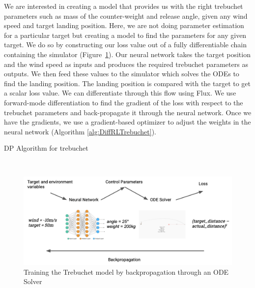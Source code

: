 \documentclass{juliacon}
\begin{document}
We are interested in creating a model that provides us with the right trebuchet parameters such as mass of the counter-weight and release angle, given any wind speed and target landing position. Here, we are not doing parameter estimation for a particular target but creating a model to find the parameters for any given target. We do so by constructing our loss value out of a fully differentiable chain containing the simulator (Figure~\ref{fig:trebuchet}). Our neural network takes the target position and the wind speed as inputs and produces the required trebuchet parameters as outputs. We then feed these values to the simulator which solves the ODEs to find the landing position. The landing position is compared with the target to get a scalar loss value. We can differentiate through this flow using Flux. We use forward-mode differentiation to find the gradient of the loss with respect to the trebuchet parameters and back-propagate it through the neural network. Once we have the gradients, we use a gradient-based optimizer to adjust the weights in the neural network (Algorithm \ref{alg:DiffRLTrebuchet}).

\begin{algorithm}[!htb]
    \caption{DP Algorithm for trebuchet}
    \label{alg:DiffRLTrebuchet}
    \SetAlgoLined
    \
\end{algorithm}

\begin{figure}[!htbp]
    \centering
    \includegraphics[width=\linewidth]{images/trebuchet-flow.png}
    \caption{Training the Trebuchet model by backpropagation through an ODE Solver}
    \label{fig:trebuchet}
\end{figure}
\end{document}
